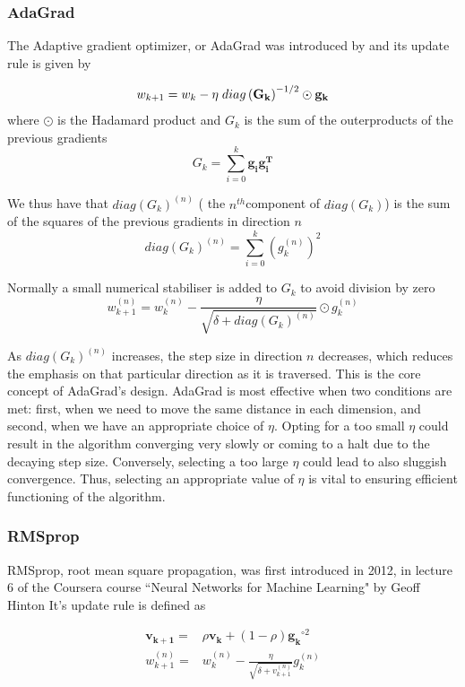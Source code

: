 \documentclass{article}
\theoremstyle{definition}
\begin{document}
\subsubsection{AdaGrad}
The Adaptive gradient optimizer, or AdaGrad was introduced by \textcite{duchi2011adaptive} and its update rule is given by

\[ w_{k+1}= w_{k}-\eta \hspace{1mm} diag\left(\mathbf{G_{k}}\right)^{-1/2} \odot \mathbf{ g_k} \]
where $\odot$ is the Hadamard product and $G_k$ is the sum of the outerproducts of the previous gradients
\begin{equation*}
    G_k = \sum_{i = 0}^k \mathbf{g_i} \mathbf{g_i^T}
\end{equation*}

 We thus have that $diag\left(G_{k}\right)^{(n)}$ ( the $n^{th}$component of $diag\left(G_k\right)$) is the sum of the squares of the previous gradients in direction $n$
 \[
 diag\left(G_{k}\right)^{(n)} = \sum_{i=0}^k  \left(g_k^{(n)}\right)^2 
 \]

 Normally a small numerical stabiliser is added to $G_k$ to avoid division by zero
 \[
 w_{k+1}^{(n)}= w_{k}^{(n)}- \frac{\eta}{ \sqrt{\delta+diag\left(G_{k}\right)^{(n)}}} \odot g_k^{(n)}
 \]
 

As $diag\left(G_k\right)^{(n)}$ increases, the step size in direction $n$ decreases, which reduces the emphasis on that particular direction as it is traversed. This is the core concept of AdaGrad's design. AdaGrad is most effective when two conditions are met: first, when we need to move the same distance in each dimension, and second, when we have an appropriate choice of $\eta$. Opting for a too small $\eta$ could result in the algorithm converging very slowly or coming to a halt due to the decaying step size. Conversely, selecting a too large $\eta$ could lead to also sluggish convergence. Thus, selecting an appropriate value of $\eta$ is vital to ensuring efficient functioning of the algorithm. 


\subsubsection{RMSprop}
RMSprop, root mean square propagation, was first introduced in 2012, in lecture 6 of the Coursera course ``Neural Networks for Machine Learning" by Geoff Hinton
\parencite{NNforML-Lecture6} It's update rule is defined as 

\begin{align*}
    \mathbf{v_{k+1}} =& \rho \mathbf{v_{k}} + (1-\rho) \mathbf{g_k}^{\circ 2}\\
    w_{k+1}^{(n)} =& w_k^{(n)} - \frac{\eta}{  \sqrt{\delta + v_{k+1}^{(n)}}} g_k^{(n)}
\end{align*}
\end{document}
